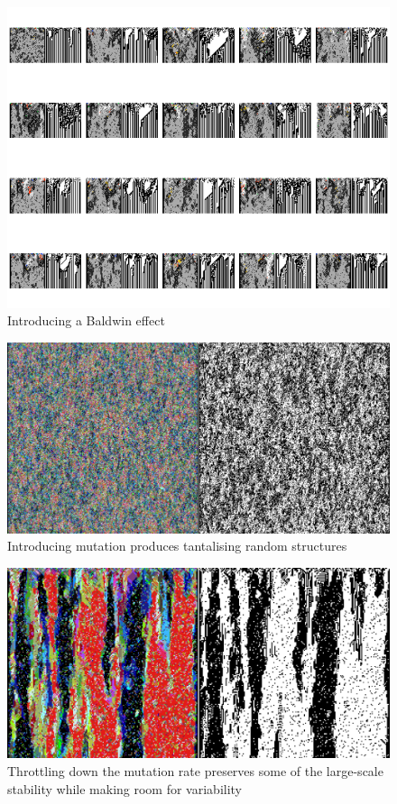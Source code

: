 \documentclass{AISB2008}
\begin{document}
\begin{figure}
\includegraphics[width=\columnwidth]{baldwin.png}
\caption{Introducing a Baldwin effect}
\end{figure}

\begin{figure}
\includegraphics[width=\columnwidth]{big.png}
\caption{Introducing mutation produces tantalising random structures}
\end{figure}

\begin{figure}
\includegraphics[width=\columnwidth]{lamp-down-low.png}
\caption{Throttling down the mutation rate preserves some of the large-scale stability while making room for variability}
\end{figure}
\end{document}
